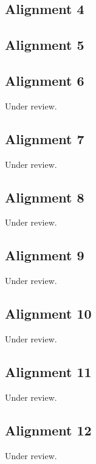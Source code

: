 \documentclass{scrartcl}
\begin{document}
\subsection{Alignment 4}
\label{sec:align_4}
\clearpage

\subsection{Alignment 5}
\label{sec:align_5}
\clearpage

\subsection{Alignment 6}
\label{sec:align_6}
Under review.%
\clearpage

\subsection{Alignment 7}
\label{sec:align_7}
Under review.%
\clearpage

\subsection{Alignment 8}
\label{sec:align_8}
Under review.%
\clearpage

\subsection{Alignment 9}
\label{sec:align_9}
Under review.%
\clearpage

\subsection{Alignment 10}
\label{sec:align_10}
Under review.%
\clearpage

\subsection{Alignment 11}
\label{sec:align_11}
Under review.%
\clearpage

\subsection{Alignment 12}
\label{sec:align_12}
Under review.%
\clearpage
\end{document}
